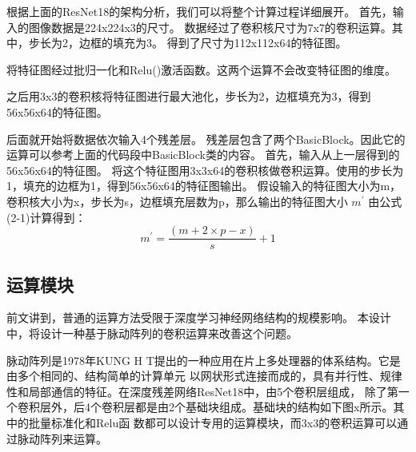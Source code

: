 根据上面的ResNet18的架构分析，我们可以将整个计算过程详细展开。
首先，输入的图像数据是224x224x3的尺寸。
数据经过了卷积核尺寸为7x7的卷积运算。其中，步长为2，边框的填充为3。
得到了尺寸为112x112x64的特征图。



将特征图经过批归一化和Relu()激活函数。这两个运算不会改变特征图的维度。


之后用3x3的卷积核将特征图进行最大池化，步长为2，边框填充为3，得到56x56x64的特征图。


后面就开始将数据依次输入4个残差层。
残差层包含了两个BasicBlock。因此它的运算可以参考上面的代码段中BasicBlock类的内容。
首先，输入从上一层得到的56x56x64的特征图。
将这个特征图用3x3x64的卷积核做卷积运算。使用的步长为1，填充的边框为1，得到56x56x64的特征图输出。
假设输入的特征图大小为m，卷积核大小为x，步长为s，边框填充层数为p，那么输出的特征图大小 $m^{'}$ 由公式(2-1)计算得到：
\begin{equation}
m^{'} = \frac{( m + 2 \times p - x )}{s} + 1 
\end{equation}



\subsection{运算模块}
前文讲到，普通的运算方法受限于深度学习神经网络结构的规模影响。
本设计中，将设计一种基于脉动阵列的卷积运算来改善这个问题。



脉动阵列是1978年KUNG H T提出的一种应用在片上多处理器的体系结构。它是由多个相同的、结构简单的计算单元
以网状形式连接而成的，具有并行性、规律性和局部通信的特征。在深度残差网络ResNet18中，由5个卷积层组成，
除了第一个卷积层外，后4个卷积层都是由2个基础块组成。基础块的结构如下图x所示。其中的批量标准化和Relu函
数都可以设计专用的运算模块，而3x3的卷积运算可以通过脉动阵列来运算。 

